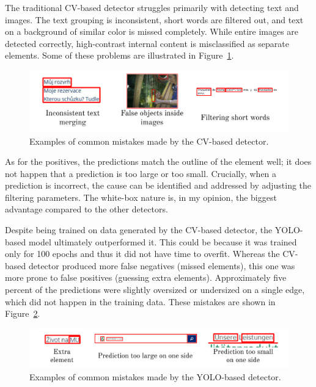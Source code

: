 \documentclass[
  digital,     %
  oneside,     %
  nosansbold,  %
  nocolorbold, %
  lof,         %
  lot,         %
]{fithesis4}
\begin{document}
The traditional CV-based detector struggles primarily with detecting text and images. The text grouping is inconsistent, short words are filtered out, and text on a background of similar color is missed completely. While entire images are detected correctly, high-contrast internal content is misclassified as separate elements. Some of these problems are illustrated in Figure~\ref{fig:cv-mistakes}.

\begin{figure}
    \centering
    \includegraphics[width=1\linewidth]{diagrams/cv_mistakes.pdf}
    \caption{Examples of common mistakes made by the CV-based detector.}
    \label{fig:cv-mistakes}
\end{figure}

As for the positives, the predictions match the outline of the element well; it does not happen that a prediction is too large or too small. Crucially, when a prediction is incorrect, the cause can be identified and addressed by adjusting the filtering parameters. The white-box nature is, in my opinion, the biggest advantage compared to the other detectors.

Despite being trained on data generated by the CV-based detector, the YOLO-based model ultimately outperformed it. This could be because it was trained only for 100 epochs and thus it did not have time to overfit. Whereas the CV-based detector produced more false negatives (missed elements), this one was more prone to false positives (guessing extra elements). Approximately five percent of the predictions were slightly oversized or undersized on a single edge, which did not happen in the training data. These mistakes are shown in Figure~\ref{fig:yolo-mistakes}.

\begin{figure}
    \centering
    \includegraphics[width=1\linewidth]{diagrams/yolo_mistakes.pdf}
    \caption{Examples of common mistakes made by the YOLO-based detector.}
    \label{fig:yolo-mistakes}
\end{figure}
\end{document}
